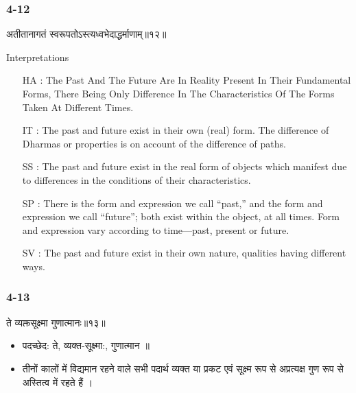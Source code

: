 \begin{frame}[fragile]\frametitle{4-12}
\begin{sanskrit}
अतीतानागतं स्वरूपतोऽस्त्यध्वभेदाद्धर्माणाम्॥१२॥
\end{sanskrit}

Interpretations
\begin{itemize}	
\item [HA]: The Past And The Future Are In Reality Present In Their Fundamental Forms, There Being Only Difference In The Characteristics Of The Forms Taken At Different Times.
\item [IT]: The past and future exist in their own (real) form. The difference of Dharmas or properties is on account of the difference of paths.
\item [SS]: The past and future exist in the real form of objects which manifest due to differences in the conditions of their characteristics.
\item [SP]: There is the form and expression we call “past,” and the form and expression we call “future”; both exist within the object, at all times. Form and expression vary according to time—past, present or future.
\item [SV]: The past and future exist in their own nature, qualities having different ways. 
\end{itemize}
\end{frame}


\begin{frame}[fragile]\frametitle{4-13}
\begin{sanskrit}
ते व्यक्तसूक्ष्मा गुणात्मानः॥१३॥
\end{sanskrit}

\begin{itemize}
\item पदच्छेद:  ते, व्यक्त-सूक्ष्मा:, गुणात्मान ॥
\item तीनों कालों में विद्यमान रहने वाले सभी पदार्थ व्यक्त या प्रकट एवं सूक्ष्म रूप से अप्रत्यक्ष गुण रूप से अस्तित्व में रहते हैं ।
\end{itemize}
\end{frame}



